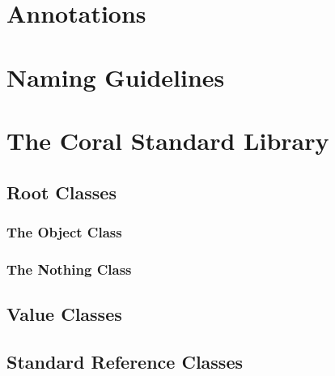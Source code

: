 \chapter{Annotations}

\chapter{Naming Guidelines}

\chapter{The Coral Standard Library}

\section{Root Classes}

\subsection{The Object Class}

\subsection{The Nothing Class}

\section{Value Classes}

\section{Standard Reference Classes}



















